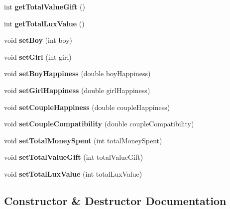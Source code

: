 \begin{DoxyCompactItemize}
int {\bfseries get\+Total\+Value\+Gift} ()
\item 
\mbox{\label{class_couple_a5a0eb92f15642dc8e7cd72bf75ccd02b}} 
int {\bfseries get\+Total\+Lux\+Value} ()
\item 
\mbox{\label{class_couple_ae16d38269290cae8c24f44c5073e6ffe}} 
void {\bfseries set\+Boy} (int boy)
\item 
\mbox{\label{class_couple_a418dbbadaef0291366d56b3cfad7d8b1}} 
void {\bfseries set\+Girl} (int girl)
\item 
\mbox{\label{class_couple_ab03f42cc0696c0729df9801c85359df5}} 
void {\bfseries set\+Boy\+Happiness} (double boy\+Happiness)
\item 
\mbox{\label{class_couple_addf2ca90054b7be79b9c38ce5b70a5cf}} 
void {\bfseries set\+Girl\+Happiness} (double girl\+Happiness)
\item 
\mbox{\label{class_couple_ae62710e06d551dbb4f1c8cbded3f51a5}} 
void {\bfseries set\+Couple\+Happiness} (double couple\+Happiness)
\item 
\mbox{\label{class_couple_a4f6057f02429f79b1aded858ee7c0cbc}} 
void {\bfseries set\+Couple\+Compatibility} (double couple\+Compatibility)
\item 
\mbox{\label{class_couple_a0f23ce2cc70d910dd18fa8a29270150f}} 
void {\bfseries set\+Total\+Money\+Spent} (int total\+Money\+Spent)
\item 
\mbox{\label{class_couple_afe9e4995c8069d446a9b161ddc94839d}} 
void {\bfseries set\+Total\+Value\+Gift} (int total\+Value\+Gift)
\item 
\mbox{\label{class_couple_a051b00b0fb8e3bbb88e728c72f79a546}} 
void {\bfseries set\+Total\+Lux\+Value} (int total\+Lux\+Value)
\end{DoxyCompactItemize}


\subsection{Constructor \& Destructor Documentation}
\mbox{\label{class_couple_ade28403308aff7ddb1ac1e7ec7b94ebf}} 
